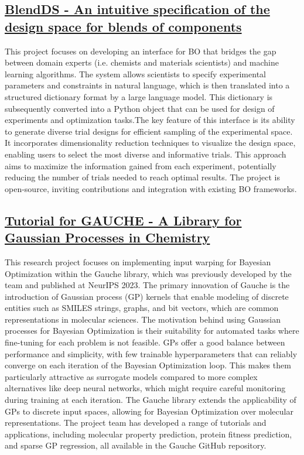  \subsection*{\href{https://www.youtube.com/watch?v=HASa3tFLZoI}{BlendDS - An intuitive specification of the design space for blends of components}}

This project focuses on developing an interface for BO that bridges the gap between domain experts (i.e. chemists and materials scientists) and machine learning algorithms. The system allows scientists to specify experimental parameters and constraints in natural language, which is then translated into a structured dictionary format by a large language model. This dictionary is subsequently converted into a Python object that can be used for design of experiments and optimization tasks.The key feature of this interface is its ability to generate diverse trial designs for efficient sampling of the experimental space. It incorporates dimensionality reduction techniques to visualize the design space, enabling users to select the most diverse and informative trials. This approach aims to maximize the information gained from each experiment, potentially reducing the number of trials needed to reach optimal results. The project is open-source, inviting contributions and integration with existing BO frameworks.
 \subsection*{\href{https://x.com/Ryan__Rhys/status/1820723528469262419}{Tutorial for GAUCHE - A Library for Gaussian Processes in Chemistry}}

This research project focuses on implementing input warping for Bayesian Optimization within the Gauche library\cite{griffiths_gauche_2024}, which was previously developed by the team and published at NeurIPS 2023. The primary innovation of Gauche is the introduction of Gaussian process (GP) kernels that enable modeling of discrete entities such as SMILES strings, graphs, and bit vectors, which are common representations in molecular sciences. The motivation behind using Gaussian processes for Bayesian Optimization is their suitability for automated tasks where fine-tuning for each problem is not feasible. GPs offer a good balance between performance and simplicity, with few trainable hyperparameters that can reliably converge on each iteration of the Bayesian Optimization loop. This makes them particularly attractive as surrogate models compared to more complex alternatives like deep neural networks, which might require careful monitoring during training at each iteration. The Gauche library extends the applicability of GPs to discrete input spaces, allowing for Bayesian Optimization over molecular representations. The project team has developed a range of tutorials and applications, including molecular property prediction, protein fitness prediction, and sparse GP regression, all available in the Gauche GitHub repository.
